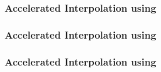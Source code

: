 \begin{frame}[t]
	\frametitle{Accelerated Interpolation using \qvasr}
	\resizebox{\textwidth}{!}{}
\end{frame}

\begin{frame}[t]	\frametitle{Accelerated Interpolation using \qvasr}
	\resizebox{0.5\textwidth}{!}{}
\end{frame}

\begin{frame}[t]
	\frametitle{Accelerated Interpolation using \qvasr}
	\begin{columns}
		\begin{column}{0.3\textwidth}
			\resizebox{0.8\textwidth}{!}{}
		\end{column}
		\begin{column}{0.55\textwidth}
			\onslide<2-5>
			\resizebox{0.4\textwidth}{!}{}
		\end{column}
	\end{columns}
\end{frame}

